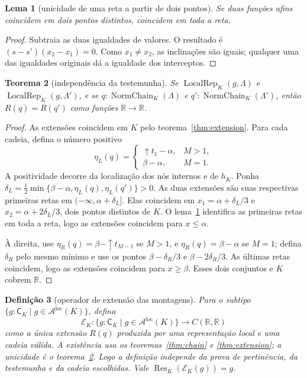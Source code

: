 \documentclass[11pt,a4paper]{article}
\newtheorem{definicao}{Definição}[section]
\newtheorem{lema}[definicao]{Lema}
\newtheorem{teorema}[definicao]{Teorema}
\newcommand{\R}{\mathbb R}
\newcommand{\CK}{\mathsf C_K}
\newcommand{\Loc}{\operatorname{LocalRep}}
\newcommand{\Res}{\operatorname{Res}}
\newcommand{\Aloc}{\mathcal A^{\mathrm{loc}}}
\begin{document}
\begin{lema}[unicidade de uma reta a partir de dois pontos]\label{lem:two_points}
Se duas funções afins coincidem em dois pontos distintos, coincidem
em toda a reta.
\end{lema}
\begin{proof}
Subtraia as duas igualdades de valores. O resultado é
$(s-s')(x_2-x_1)=0$. Como $x_1\ne x_2$, as inclinações são
iguais; qualquer uma das igualdades originais dá a igualdade dos
interceptos.
\end{proof}

\begin{teorema}[independência da testemunha]\label{thm:unique}
Se $\Loc_K(g,\Lambda)$ e $\Loc_K(g,\Lambda')$, e se
$q:\operatorname{NormChain}_K(\Lambda)$ e
$q':\operatorname{NormChain}_K(\Lambda')$, então
$R(q)=R(q')$ como funções $\R\to\R$.
\end{teorema}
\begin{proof}
As extensões coincidem em $K$ pelo teorema~\ref{thm:extension}.
Para cada cadeia, defina o número positivo
\[
 \eta_L(q)=\begin{cases}
 \uparrow t_1-\alpha,&M>1,\\
 \beta-\alpha,&M=1.
 \end{cases}
\]
A positividade decorre da localização dos nós internos e de $h_K$.
Ponha
$\delta_L=\tfrac12\min\{\beta-\alpha,\eta_L(q),\eta_L(q')\}>0$.
As duas extensões são suas respectivas primeiras retas em
$(-\infty,\alpha+\delta_L]$. Elas coincidem em
$x_1=\alpha+\delta_L/3$ e
$x_2=\alpha+2\delta_L/3$, dois pontos distintos de $K$.
O lema~\ref{lem:two_points} identifica as primeiras retas
em toda a reta, logo as extensões coincidem para $x\le\alpha$.

À direita, use
$\eta_R(q)=\beta-\uparrow t_{M-1}$ se $M>1$, e
$\eta_R(q)=\beta-\alpha$ se $M=1$; defina $\delta_R$
pelo mesmo mínimo e use os pontos
$\beta-\delta_R/3$ e $\beta-2\delta_R/3$.
As últimas retas coincidem, logo as extensões coincidem para
$x\ge\beta$. Esses dois conjuntos e $K$ cobrem $\R$.
\end{proof}

\begin{definicao}[operador de extensão das montagens]
Para o subtipo $\{g:\CK\mid g\in\Aloc(K)\}$, defina
\[
 \mathcal E_K:\{g:\CK\mid g\in\Aloc(K)\}\longrightarrow C(\R,\R)
\]
como a única extensão $R(q)$ produzida por uma representação local
e uma cadeia válida. A existência usa os
teoremas~\ref{thm:chain} e \ref{thm:extension}; a unicidade é o
teorema~\ref{thm:unique}. Logo a definição independe da prova de
pertinência, da testemunha e da cadeia escolhidas. Vale
$\Res_K(\mathcal E_K(g))=g$.
\end{definicao}
\end{document}

